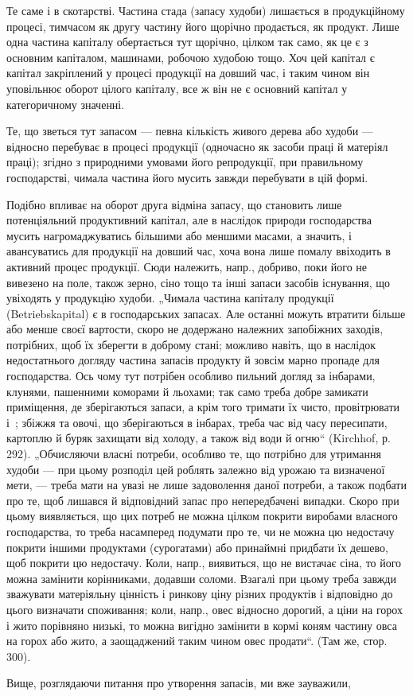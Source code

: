 
Те саме і в скотарстві. Частина стада (запасу худоби) лишається в продукційному процесі, тимчасом як
другу частину його щорічно продається, як продукт. Лише одна частина капіталу обертається тут
щорічно, цілком так само, як це є з основним капіталом, машинами, робочою худобою тощо. Хоч цей
капітал є капітал закріплений у процесі продукції на довший час, і таким чином він уповільнює оборот
цілого капіталу, все ж він не є основний капітал у категоричному значенні.

Те, що зветься тут запасом — певна кількість живого дерева або худоби — відносно перебуває в процесі
продукції (одночасно як засоби праці й матеріял праці); згідно з природними умовами його
репродукції, при правильному господарстві, чимала частина його мусить завжди перебувати в цій формі.

Подібно впливає на оборот друга відміна запасу, що становить лише потенціяльний продуктивний
капітал, але в наслідок природи господарства мусить нагромаджуватись більшими або меншими масами, а
значить, і авансуватись для продукції на довший час, хоча вона лише помалу ввіходить в активний
процес продукції. Сюди належить, напр., добриво, поки його не вивезено на поле, також зерно, сіно
тощо та інші запаси засобів існування, що увіходять у продукцію худоби. „Чимала частина капіталу
продукції (Betriebskapital) є в господарських запасах. Але останні можуть втратити більше або менше
своєї вартости, скоро не додержано належних запобіжних заходів, потрібних, щоб їх зберегти в доброму
стані; можливо навіть, що в наслідок недостатнього догляду частина запасів продукту й зовсім марно
пропаде для господарства. Ось чому тут потрібен особливо пильний догляд за інбарами, клунями,
пашенними коморами й льохами; так само треба добре замикати приміщення, де зберігаються запаси, а
крім того тримати їх чисто, провітрювати і~; збіжжя та овочі, що зберігаються в інбарах, треба
час від часу пересипати, картоплю й буряк захищати від холоду, а також від води й огню“ (Kirchhof,
р. 292). „Обчисляючи власні потреби, особливо те, що потрібно для утримання худоби — при цьому
розподіл цей роблять залежно від урожаю та визначеної мети, — треба мати на увазі не лише
задоволення даної потреби, а також подбати про те, щоб лишався й відповідний запас про непередбачені
випадки. Скоро при цьому виявляється, що цих потреб не можна цілком покрити виробами власного
господарства, то треба насамперед подумати про те, чи не можна цю недостачу покрити іншими
продуктами (сурогатами) або принаймні придбати їх дешево, щоб покрити цю недостачу. Коли, напр.,
виявиться, що не вистачає сіна, то його можна замінити корінниками, додавши соломи. Взагалі при цьому
треба завжди зважувати матеріяльну цінність і ринкову ціну різних продуктів і відповідно до цього
визначати споживання; коли, напр., овес відносно дорогий, а ціни на горох і жито порівняно низькі,
то можна вигідно замінити в кормі коням частину овса на горох або жито, а заощаджений таким чином
овес продати“. (Там же, стор. 300).

Вище, розглядаючи питання про утворення запасів, ми вже зауважили,
\parbreak{}  %
